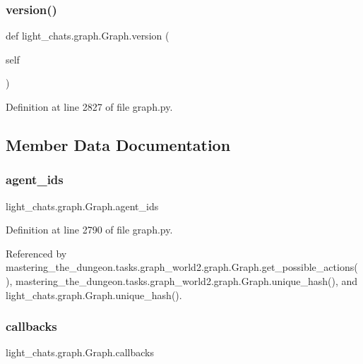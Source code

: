 \subsubsection{\texorpdfstring{version()}{version()}}
{\footnotesize\ttfamily def light\+\_\+chats.\+graph.\+Graph.\+version (\begin{DoxyParamCaption}\item[{}]{self }\end{DoxyParamCaption})}



Definition at line 2827 of file graph.\+py.



\subsection{Member Data Documentation}
\mbox{\label{classlight__chats_1_1graph_1_1Graph_a2bd5d1191b6a64402e7bb1f992516265}} 
\subsubsection{\texorpdfstring{agent\+\_\+ids}{agent\_ids}}
{\footnotesize\ttfamily light\+\_\+chats.\+graph.\+Graph.\+agent\+\_\+ids}



Definition at line 2790 of file graph.\+py.



Referenced by mastering\+\_\+the\+\_\+dungeon.\+tasks.\+graph\+\_\+world2.\+graph.\+Graph.\+get\+\_\+possible\+\_\+actions(), mastering\+\_\+the\+\_\+dungeon.\+tasks.\+graph\+\_\+world2.\+graph.\+Graph.\+unique\+\_\+hash(), and light\+\_\+chats.\+graph.\+Graph.\+unique\+\_\+hash().

\mbox{\label{classlight__chats_1_1graph_1_1Graph_a95a1a4d31dbd607eebd593579b2d6cdd}} 
\subsubsection{\texorpdfstring{callbacks}{callbacks}}
{\footnotesize\ttfamily light\+\_\+chats.\+graph.\+Graph.\+callbacks}



